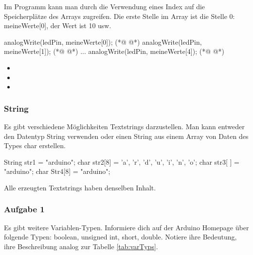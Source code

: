 Im Programm kann man durch die Verwendung eines Index auf die Speicherplätze des Arrays zugreifen. Die erste Stelle im Array ist die Stelle 0: meineWerte[0], der Wert ist 10 usw.

\begin{multicols}{2}
\null\vfill   
\begin{arduinoCode}{}{}
analogWrite(ledPin, meineWerte[0]); (*@  @*)
analogWrite(ledPin, meineWerte[1]); (*@  @*)
...
analogWrite(ledPin, meineWerte[4]); (*@  @*)
\end{arduinoCode}
\vfill\null 
\columnbreak

\null\vfill
\begin{itemize}
  \itemsep15pt
  \item[] 
  \item[] 
    \item[] 
\end{itemize}
\vfill \null



\end{multicols}


\subsubsection{String}
Es gibt verschiedene Möglichkeiten Textstrings darzustellen. Man kann entweder den Datentyp String verwenden oder einen String aus einem Array von Daten des Types char erstellen.
 
\begin{arduinoCode}{}{}
  String str1 = "arduino";
  char str2[8] = {'a', 'r', 'd', 'u', 'i', 'n', 'o'};
  char str3[ ] = "arduino";
  char Str4[8] = "arduino";
\end{arduinoCode}
Alle erzeugten Textstrings haben denselben Inhalt.


\subsubsection{Aufgabe 1}
Es gibt weitere Variablen-Typen. Informiere dich auf der Arduino Homepage  über folgende Typen: 
boolean, unsigned int, short, double. 
Notiere ihre Bedeutung, ihre Beschreibung analog zur Tabelle \ref{tab:varTyps}.

